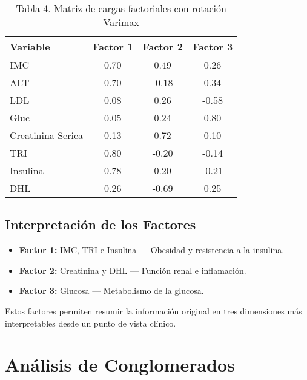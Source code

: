 \documentclass[12pt]{report}
\begin{document}
\begin{table}[H]
\centering
\begin{tabular}{|l|c|c|c|}
\hline
\textbf{Variable} & \textbf{Factor 1} & \textbf{Factor 2} & \textbf{Factor 3} \\
\hline
IMC & 0.70 & 0.49 & 0.26 \\
ALT & 0.70 & -0.18 & 0.34 \\
LDL & 0.08 & 0.26 & -0.58 \\
Gluc & 0.05 & 0.24 & 0.80 \\
Creatinina Serica & 0.13 & 0.72 & 0.10 \\
TRI & 0.80 & -0.20 & -0.14 \\
Insulina & 0.78 & 0.20 & -0.21 \\
DHL & 0.26 & -0.69 & 0.25 \\
\hline
\end{tabular}
\caption{Tabla 4. Matriz de cargas factoriales con rotación Varimax}
\end{table}

\subsection{Interpretación de los Factores}
\begin{itemize}
    \item \textbf{Factor 1:} IMC, TRI e Insulina — Obesidad y resistencia a la insulina.
    \item \textbf{Factor 2:} Creatinina y DHL — Función renal e inflamación.
    \item \textbf{Factor 3:} Glucosa — Metabolismo de la glucosa.
\end{itemize}

\noindent Estos factores permiten resumir la información original en tres dimensiones más interpretables desde un punto de vista clínico.

\newpage

\section{Análisis de Conglomerados}
\end{document}
